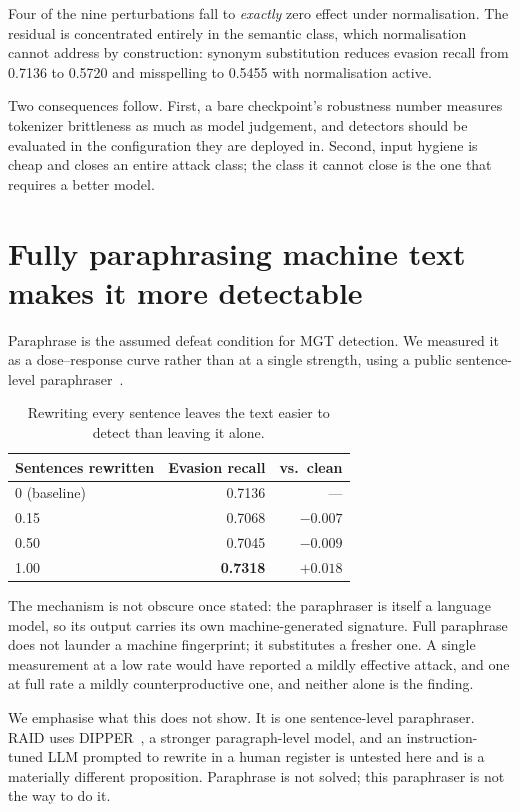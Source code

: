 \documentclass[11pt]{article}
\begin{document}
Four of the nine perturbations fall to \emph{exactly} zero effect under
normalisation. The residual is concentrated entirely in the semantic class, which
normalisation cannot address by construction: synonym substitution reduces evasion
recall from 0.7136 to 0.5720 and misspelling to 0.5455 with normalisation active.

Two consequences follow. First, a bare checkpoint's robustness number measures
tokenizer brittleness as much as model judgement, and detectors should be
evaluated in the configuration they are deployed in. Second, input hygiene is
cheap and closes an entire attack class; the class it cannot close is the one
that requires a better model.

\section{Fully paraphrasing machine text makes it more detectable}
\label{sec:paraphrase}

Paraphrase is the assumed defeat condition for MGT detection. We measured it as
a dose--response curve rather than at a single strength, using a public
sentence-level paraphraser~\cite{humarin}.

\begin{table}[h]
\centering
\begin{tabular}{lrr}
\toprule
Sentences rewritten & Evasion recall & vs.\ clean \\
\midrule
0 (baseline) & 0.7136 & --- \\
0.15 & 0.7068 & $-0.007$ \\
0.50 & 0.7045 & $-0.009$ \\
1.00 & \textbf{0.7318} & $\mathbf{+0.018}$ \\
\bottomrule
\end{tabular}
\caption{Rewriting every sentence leaves the text easier to detect than leaving
it alone.}
\end{table}

The mechanism is not obscure once stated: the paraphraser is itself a language
model, so its output carries its own machine-generated signature. Full paraphrase
does not launder a machine fingerprint; it substitutes a fresher one. A single
measurement at a low rate would have reported a mildly effective attack, and one
at full rate a mildly counterproductive one, and neither alone is the finding.

We emphasise what this does not show. It is one sentence-level paraphraser. RAID
uses DIPPER~\cite{dipper}, a stronger paragraph-level model, and an
instruction-tuned LLM prompted to rewrite in a human register is untested here
and is a materially different proposition. Paraphrase is not solved; this
paraphraser is not the way to do it.
\end{document}
